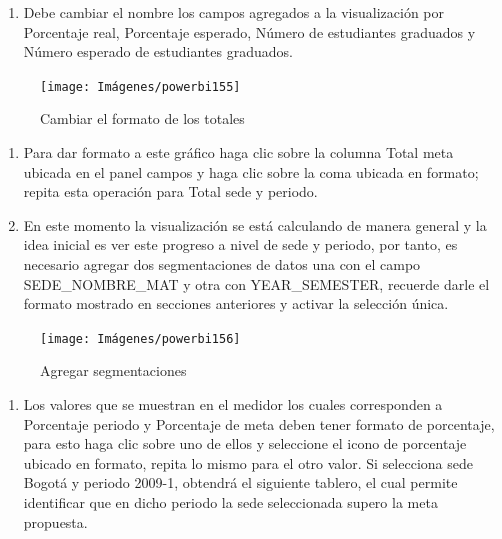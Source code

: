 \documentclass[
]{book}
\providecommand{\tightlist}{%
  \setlength{\itemsep}{0pt}\setlength{\parskip}{0pt}}
\begin{document}
\begin{enumerate}
\def\labelenumi{\arabic{enumi}.}
\setcounter{enumi}{2}
\tightlist
\item
  Debe cambiar el nombre los campos agregados a la visualización por Porcentaje real, Porcentaje esperado, Número de estudiantes graduados y Número esperado de estudiantes graduados.
\end{enumerate}

\begin{figure}

{\centering \texttt{[image: Imágenes/powerbi155]} 

}

\caption{Cambiar el formato de los totales}\label{fig:paso3medidor-fig}
\end{figure}

\begin{enumerate}
\def\labelenumi{\arabic{enumi}.}
\setcounter{enumi}{3}
\item
  Para dar formato a este gráfico haga clic sobre la columna Total meta ubicada en el panel campos y haga clic sobre la coma ubicada en formato; repita esta operación para Total sede y periodo.
\item
  En este momento la visualización se está calculando de manera general y la idea inicial es ver este progreso a nivel de sede y periodo, por tanto, es necesario agregar dos segmentaciones de datos una con el campo SEDE\_NOMBRE\_MAT y otra con YEAR\_SEMESTER, recuerde darle el formato mostrado en secciones anteriores y activar la selección única.
\end{enumerate}

\begin{figure}

{\centering \texttt{[image: Imágenes/powerbi156]} 

}

\caption{Agregar segmentaciones}\label{fig:paso5medidor-fig}
\end{figure}

\begin{enumerate}
\def\labelenumi{\arabic{enumi}.}
\setcounter{enumi}{5}
\tightlist
\item
  Los valores que se muestran en el medidor los cuales corresponden a Porcentaje periodo y Porcentaje de meta deben tener formato de porcentaje, para esto haga clic sobre uno de ellos y seleccione el icono de porcentaje ubicado en formato, repita lo mismo para el otro valor. Si selecciona sede Bogotá y periodo 2009-1, obtendrá el siguiente tablero, el cual permite identificar que en dicho periodo la sede seleccionada supero la meta propuesta.
\end{enumerate}
\end{document}
